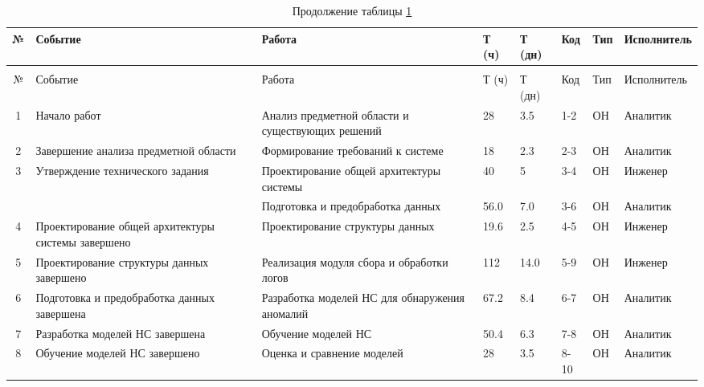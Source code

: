 {
\fontsize{10}{10}\selectfont
\setlength{\tabcolsep}{3pt}

\begin{longtable}{|c|p{3cm}|p{3cm}|p{1.5cm}|p{1.5cm}|p{1.2cm}|p{1.2cm}|p{2.9cm}|}
\caption{Соответствие событий и работ}\label{tab:work_codes} \\
\hline
№ & Событие & Работа & Т (ч) & Т (дн) & Код  & Тип & Исполнитель \\ \hline
\endfirsthead

\caption*{Продолжение таблицы \ref{tab:work_codes}}\\ \hline
№ & Событие & Работа & Т (ч) & Т (дн) & Код  & Тип & Исполнитель \\ \hline
\endhead

\hline
\endfoot

\hline
\endlastfoot

1 & Начало работ & Анализ предметной области и существующих решений & 28 & 3.5 & 1-2 & ОН & Аналитик \\ \hline

2 & Завершение анализа предметной области & Формирование требований к системе & 18 & 2.3 & 2-3 & ОН & Аналитик \\ \hline

\multirow{2}{*}{3} & \multirow{2}{*}{\parbox{3cm}{Утверждение технического задания}}
& Проектирование общей архитектуры системы & 40 & 5 & 3-4 & ОН & Инженер \\ \cline{3-8}
& & Подготовка и предобработка данных & 56.0  & 7.0 & 3-6 & ОН & Аналитик \\ \hline

4 & Проектирование общей архитектуры системы завершено & Проектирование структуры данных & 19.6  & 2.5 & 4-5 & ОН & Инженер \\ \hline

5 & Проектирование структуры данных завершено & Реализация модуля сбора и обработки логов & 112 & 14.0 & 5-9 & ОН & Инженер \\ \hline

6 & Подготовка и предобработка данных завершена & Разработка моделей НС для обнаружения аномалий & 67.2 & 8.4 & 6-7 & ОН & Аналитик \\ \hline

7 & Разработка моделей НС завершена & Обучение моделей НС & 50.4 & 6.3 & 7-8 & ОН & Аналитик \\ \hline

8 & Обучение моделей НС завершено & Оценка и сравнение моделей & 28  & 3.5 & 8-10 & ОН & Аналитик \\ \hline


\end{longtable}}
